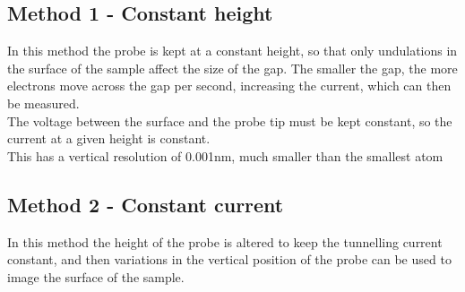 \documentclass[12pt]{article}
\begin{document}
\subsection{Method 1 - Constant height}
In this method the probe is kept at a constant height, so that only undulations in the surface of the sample affect the size of the gap. The smaller the gap, the more electrons move across the gap per second, increasing the current, which can then be measured.\\
The voltage between the surface and the probe tip must be kept constant, so the current at a given height is constant.\\
This has a vertical resolution of 0.001nm, much smaller than the smallest atom
\subsection{Method 2 - Constant current}
In this method the height of the probe is altered to keep the tunnelling current constant, and then variations in the vertical position of the probe can be used to image the surface of the sample.
\end{document}
